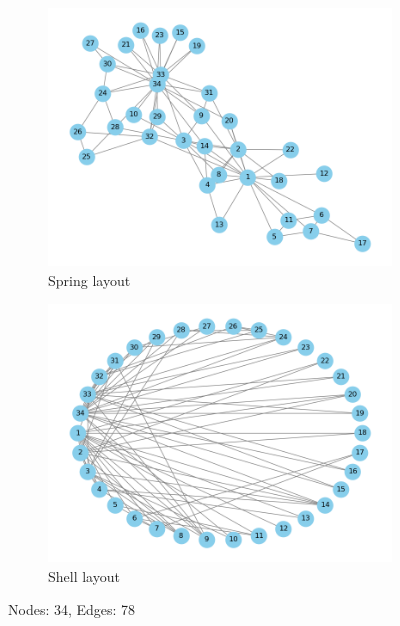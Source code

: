 \documentclass[10pt,letterpaper, onecolumn]{report}
\begin{document}
\begin{flushleft}
    \begin{figure}[htbp!]
        \centering
        \begin{subfigure}{0.45\textwidth}
            \centering
            \includegraphics[width=\textwidth]{../graph.png}
            \caption{Spring layout}
        \end{subfigure}
        \hfill
        \begin{subfigure}{0.45\textwidth}
            \centering
            \includegraphics[width=\textwidth]{../zachary_karate_club_shell_layout.png}
            \caption{Shell layout}
        \end{subfigure}
        \caption{Nodes: 34, Edges: 78}
    \end{figure}
    
\end{flushleft}
\end{document}
